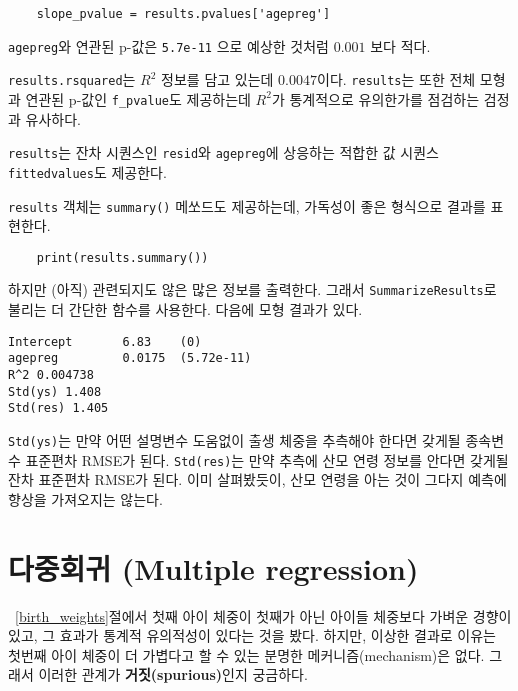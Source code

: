 \begin{verbatim}
    slope_pvalue = results.pvalues['agepreg']
\end{verbatim}

{\tt agepreg}와 연관된 p-값은 {\tt 5.7e-11} 으로 예상한 것처럼 $0.001$ 보다 적다.

{\tt results.rsquared}는 $R^2$ 정보를 담고 있는데 $0.0047$이다.  
{\tt results}는 또한 전체 모형과 연관된 p-값인 \verb"f_pvalue"도 제공하는데 $R^2$가 통계적으로 유의한가를 점검하는 검정과 유사하다. 

{\tt results}는 잔차 시퀀스인 {\tt resid}와 {\tt agepreg}에 상응하는 적합한 값 시퀀스 {\tt fittedvalues}도 제공한다.

{\tt results} 객체는 {\tt summary()} 메쏘드도 제공하는데,
가독성이 좋은 형식으로 결과를 표현한다.

\begin{verbatim}
    print(results.summary())
\end{verbatim}
하지만 (아직) 관련되지도 않은 많은 정보를 출력한다.
그래서 {\tt SummarizeResults}로 불리는 더 간단한 함수를 사용한다.
다음에 모형 결과가 있다.

\begin{verbatim}
Intercept       6.83    (0)
agepreg         0.0175  (5.72e-11)
R^2 0.004738
Std(ys) 1.408
Std(res) 1.405
\end{verbatim}

{\tt Std(ys)}는 만약 어떤 설명변수 도움없이 출생 체중을 추측해야 한다면 갖게될 종속변수 표준편차 RMSE가 된다.
{\tt Std(res)}는 만약 추측에 산모 연령 정보를 안다면 갖게될 잔차 표준편차 RMSE가 된다. 
이미 살펴봤듯이, 산모 연령을 아는 것이 그다지 예측에 향상을 가져오지는 않는다.



\section{다중회귀 (Multiple regression)}
\label{multiple}

~\ref{birth_weights}절에서 첫째 아이 체중이 첫째가 아닌 아이들 체중보다 가벼운 경향이 있고, 그 효과가 통계적 유의적성이 있다는 것을 봤다.
하지만, 이상한 결과로 이유는 첫번째 아이 체중이 더 가볍다고 할 수 있는 분명한 메커니즘(mechanism)은 없다. 그래서 이러한 관계가 {\bf 거짓(spurious)}인지 궁금하다.


